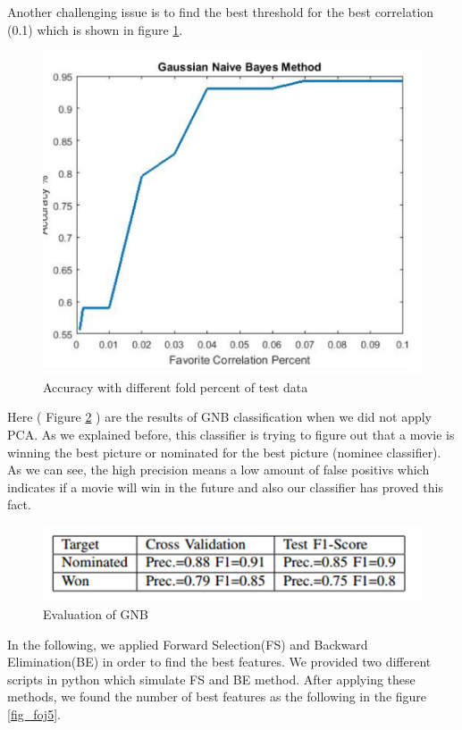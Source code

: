 \documentclass[journal,transmag]{IEEEtran}
\begin{document}
Another challenging issue is to find the best threshold for the best correlation (0.1) which is shown in figure \ref{fig_foj3}.
\begin{figure}
\includegraphics[scale=.38]{figfoj3}
 \caption{Accuracy with different fold percent of test data}
\label{fig_foj3}
\end{figure}
Here ( Figure \ref{fig_foj4} ) are the results of GNB classification when we did not apply PCA. As we explained before, this classifier is trying to figure out that a movie is winning the best picture or nominated for the best picture (nominee classifier). As we can see, the high precision means a low amount of false positivs which indicates if a movie will win in the future and also our classifier has proved this fact.

\begin{figure}
\includegraphics[scale=.35]{foj4}
 \caption{Evaluation of GNB }
\label{fig_foj4}
\end{figure}

In the following, we applied Forward Selection(FS) and Backward Elimination(BE) in order to find the best features. We provided two different scripts in python which simulate FS and BE method. After applying these methods, we found the number of best features as the following in the figure \ref{fig_foj5}.
\end{document}

